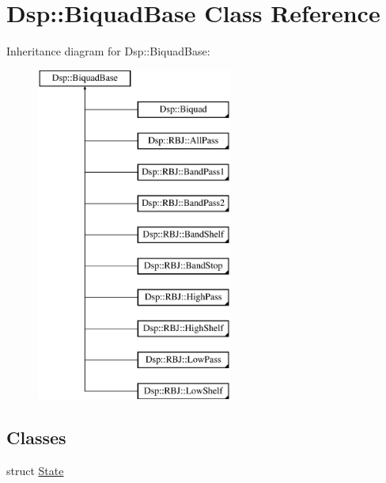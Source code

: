 \hypertarget{classDsp_1_1BiquadBase}{\section{Dsp\-:\-:Biquad\-Base Class Reference}
\label{classDsp_1_1BiquadBase}
}
Inheritance diagram for Dsp\-:\-:Biquad\-Base\-:\begin{figure}[H]
\begin{center}
\leavevmode
\includegraphics[height=11.000000cm]{classDsp_1_1BiquadBase}
\end{center}
\end{figure}
\subsection*{Classes}
\begin{DoxyCompactItemize}
\item 
struct \hyperlink{structDsp_1_1BiquadBase_1_1State}{State}
\end{DoxyCompactItemize}
